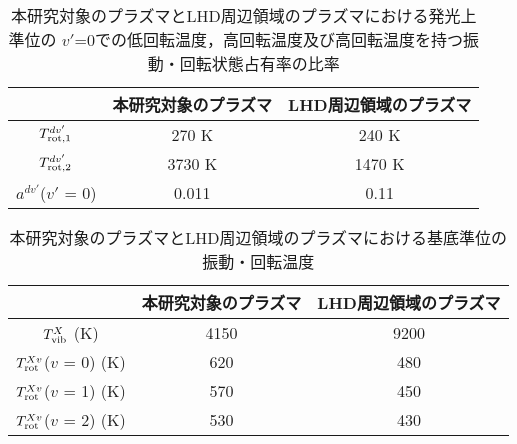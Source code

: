 \begin{table}
    \caption{本研究対象のプラズマとLHD周辺領域のプラズマにおける発光上準位の
    $v'$=0での低回転温度，高回転温度及び高回転温度を持つ振動・回転状態占有率の比率}
    \label{table:two-result-table}
    \centering
    \begin{tabular}{ccc}
        \hline
         & 本研究対象のプラズマ & LHD周辺領域のプラズマ\\
        \hline
        $T^{dv'}_{\rm rot,1}$ & 270 K & 240 K\\
        $T^{dv'}_{\rm rot,2}$ & 3730 K & 1470 K\\
        $a^{dv'}$($v'$ = 0) & 0.011& 0.11\\
        \hline
    \end{tabular}
\end{table}

\begin{table}
    \caption{本研究対象のプラズマとLHD周辺領域のプラズマにおける基底準位の振動・回転温度}
    \label{table:ground-result-compare}
    \centering
    \begin{tabular}{ccc}
        \hline
        & 本研究対象のプラズマ & LHD周辺領域のプラズマ\\
        \hline
        $T^X_{\rm vib}$ (K)& 4150 & 9200\\
        $T^{Xv}_{\rm rot}$($v$ = 0) (K)& 620 & 480\\
        $T^{Xv}_{\rm rot}$($v$ = 1) (K)& 570 & 450\\
        $T^{Xv}_{\rm rot}$($v$ = 2) (K)& 530 & 430\\
        \hline
    \end{tabular}
\end{table}
